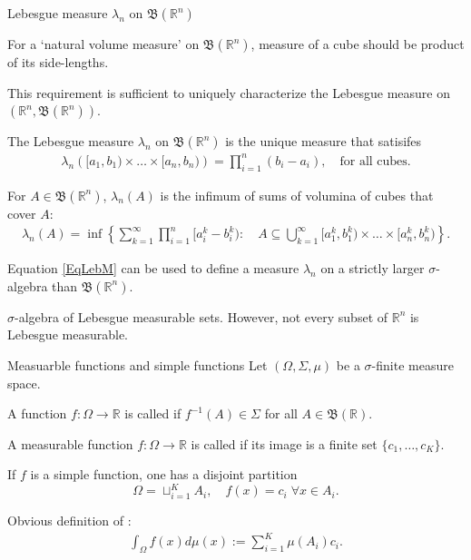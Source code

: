 \begin{frame}{Lebesgue measure $\lambda_n$ on $\mathfrak{B}(\mathbb{R}^n)$}
\bit
\item<1-> For a `natural volume measure' on $\mathfrak{B}(\mathbb{R}^n)$,
measure of a cube should be product of its side-lengths. 
\item This requirement is sufficient to uniquely characterize the Lebesgue measure on $\left(\mathbb{R}^n, \mathfrak{B}(\mathbb{R}^n)\right)$. 
\item[\iarrow] The Lebesgue measure $\lambda_n$ on $\mathfrak{B}(\mathbb{R}^n)$ is the unique measure that 
satisifes
\begin{align*}
\lambda_n\left([a_1,b_1)\times\dots\times[a_n,b_n)\right)=\prod_{i=1}^n(b_i-a_i), \quad\text{for all cubes}. 
\end{align*}
\eit
\vspace{-0.2cm}
\bit
\item<2-> For $A\in\mathfrak{B}(\mathbb{R}^n)$, $\lambda_n(A)$ is the infimum of
sums of volumina of cubes that cover $A$: 
\begin{align}\label{EqLebM}
\lambda_n(A)=\inf\left\{\sum_{k=1}^\infty \prod_{i=1}^n[a^k_i-b^k_i)\colon\quad A\subseteq\bigcup_{k=1}^\infty [a_1^k,b_1^k)\times\dots\times [a_n^k,b_n^k)\right\}.
\end{align}
\item<3-> Equation \eqref{EqLebM} can be used to define a measure $\lambda_n$ on a strictly larger $\sigma$-algebra than $\mathfrak{B}(\mathbb{R}^n)$.
\item<4->  $\sigma$-algebra of Lebesgue measurable sets. However, not every subset of $\mathbb{R}^n$ is Lebesgue measurable.
\eit


\end{frame}




\begin{frame}{Measuarble functions and simple functions} 
Let $(\Omega,\Sigma,\mu)$ be a $\sigma$-finite measure space. 

\bit
\item<1-> A function $f:\Omega\to\mathbb{R}$ is called  if
$f^{-1}(A)\in\Sigma$ for all $A\in\mathfrak{B}(\mathbb{R})$. 
\item<2-> A measurable function $f: \Omega\to\mathbb{R}$ is called  if
its image is a finite set $\{c_1,\dots,c_K\}$.  
\item<3->  If $f$ is a simple function, one has a disjoint partition
\[
\Omega=\sqcup_{i=1}^KA_i,\quad f(x)=c_i\; \forall x \in A_i. 
\]
\item<4-> [\iarrow] Obvious definition of :
\begin{align*}
\int_{\Omega}f(x)d\mu(x):=\sum_{i=1}^K\mu(A_i)c_i. 
\end{align*}
\eit
\end{frame}

